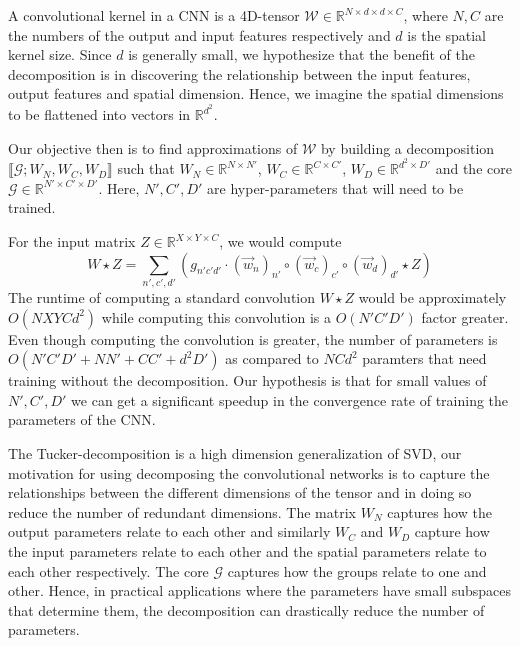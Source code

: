 \documentclass[a4paper]{article}
\newcommand{\R}{\mathbb{R}}
\newcommand{\Wc}{\mathcal{W}}
\begin{document}
\begin{multicols*}{2}
A convolutional kernel in a CNN is a 4D-tensor $\Wc \in \R^{N \times d \times d \times C}$, where $N, C$ are the numbers of the output and input features respectively and $d$ is the spatial kernel size. Since $d$ is generally small, we hypothesize that the benefit of the decomposition is in discovering the relationship between the input features, output features and spatial dimension. Hence, we imagine the spatial dimensions to be flattened into vectors in $\R^{d^2}$. 

Our objective then is to find approximations of $\Wc$ by building a decomposition $\llbracket \mathcal{G}; W_N, W_C, W_D\rrbracket$ such that $W_N \in \R^{N \times N'}$, $W_C \in \R^{C \times C'}$, $W_D \in \R^{d^2 \times D'}$ and  the core $\mathcal{G} \in \R^{N' \times C' \times D'}$. Here, $N', C', D'$ are hyper-parameters that will need to be trained.

For the input matrix $Z \in \R^{X \times Y \times C}$, we would compute 
$$W \star Z = \sum_{n', c', d'} \left( g_{n'c'd'} \cdot (\vec{w}_n)_{n'} \circ (\vec{w}_c)_{c'} \circ (\vec{w}_d)_{d'} \star Z \right)$$ 
The runtime of computing a standard convolution $W \star Z$ would be approximately $O(NXYCd^2)$ while computing this convolution is a $O(N'C'D')$ factor greater. Even though computing the convolution is greater, the number of parameters is $O(N'C'D' + NN' + CC' + d^2D')$ as compared to $NCd^2$ paramters that need training without the decomposition. Our hypothesis is that for small values of $N',C',D'$ we can get a significant speedup in the convergence rate of training the parameters of the CNN. 

The Tucker-decomposition is a high dimension generalization of \textsf{SVD}, our motivation for using decomposing the convolutional networks is to capture the relationships between the different dimensions of the tensor and in doing so reduce the number of redundant dimensions. The matrix $W_N$ captures how the output parameters relate to each other and similarly $W_C$ and $W_D$ capture how the input parameters relate to each other and the spatial parameters relate to each other respectively. The core $\mathcal{G}$ captures how the groups relate to one and other. Hence, in practical applications where the parameters have small subspaces that determine them, the decomposition can drastically reduce the number of parameters.


\end{multicols*}
\end{document}
